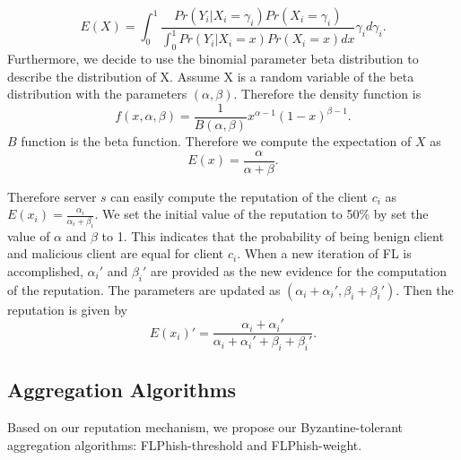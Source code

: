 \documentclass[journal]{IEEEtran}
\begin{document}
\begin{equation}
    E(X)=\int_{0}^{1}\frac{Pr\left ( Y_{i}|X_{i}=\gamma_{i} \right )Pr(X_{i}=\gamma_{i})}{\int_{0}^{1}Pr\left ( Y_{i}|X_{i}=x \right )Pr(X_{i}=x)dx}\gamma_{i}d\gamma_{i}\label{equation_3}.
\end{equation}
Furthermore, we decide to use the binomial parameter beta distribution to describe the distribution of X. Assume X is a random variable of the beta distribution with the parameters $(\alpha, \beta)$. Therefore the density function is
\begin{equation}
    f(x,\alpha,\beta)=\frac{1}{B(\alpha,\beta)}x^{\alpha-1}(1-x)^{\beta-1}\label{equation-4}.
\end{equation}
$B$ function is the beta function. Therefore we compute the expectation of $X$ as
\begin{equation}
    E(x)=\frac{\alpha}{\alpha+\beta}.
\end{equation}

Therefore server ${s}$ can easily compute the reputation of the client ${c_{i}}$ as ${E(x_{i})=\frac{\alpha_{i}}{\alpha_{i}+\beta_{i}}}$. We set the initial value of the reputation to 50\% by set the value of ${\alpha}$ and ${\beta}$ to 1. This indicates that the probability of being benign client and malicious client are equal for client ${c_{i}}$. When a new iteration of FL is accomplished, ${\alpha_{i}}'$ and ${\beta_{i}}'$ are provided as the new evidence for the computation of the reputation. The parameters are updated as ${(\alpha_{i}+{\alpha_{i}}',\beta_{i}+{\beta_{i}}')}$. Then the reputation is given by
\begin{equation}
    {E(x_{i})}'=\frac{\alpha_{i}+{\alpha_{i}}'}{\alpha_{i}+{\alpha_{i}}'+\beta_{i}+{\beta_{i}}'}.
\end{equation}



\subsection{Aggregation Algorithms}
Based on our reputation mechanism, we propose our Byzantine-tolerant aggregation algorithms: FLPhish-threshold and FLPhish-weight.
\end{document}
